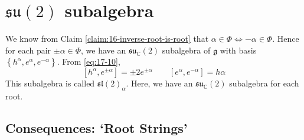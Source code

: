 \section{\texorpdfstring{$\mathfrak{su}(2)$}{Lie algebra of SU(2)} subalgebra}%
\label{sec:lie_algebra_of_su_2_subalgebra}

We know from Claim \ref{claim:16-inverse-root-is-root} that $\alpha \in \Phi \iff -\alpha \in \Phi$. Hence for each pair $\pm \alpha \in \Phi$, we have an $\mathfrak{su}_{\mathbb{C}}(2)$ subalgebra of $\mathfrak{g}$ with basis $\left\{ h^{\alpha}, e^{\alpha}, e^{-\alpha} \right\}$. From \eqref{eq:17-10}, 
\begin{equation}
  \label{eq:17-11}
  [h^{\alpha}, e^{\pm \alpha}] = \pm 2 e^{\pm \alpha} \qquad [e^{\alpha}, e^{-\alpha}] = h\alpha
\end{equation}
This subalgebra is called $\mathfrak{sl}(2)_{\alpha}$.
Here, we have an $\mathfrak{su}_{\mathbb{C}}(2)$ subalgebra for each root.

\subsection{Consequences: `Root Strings'}%

